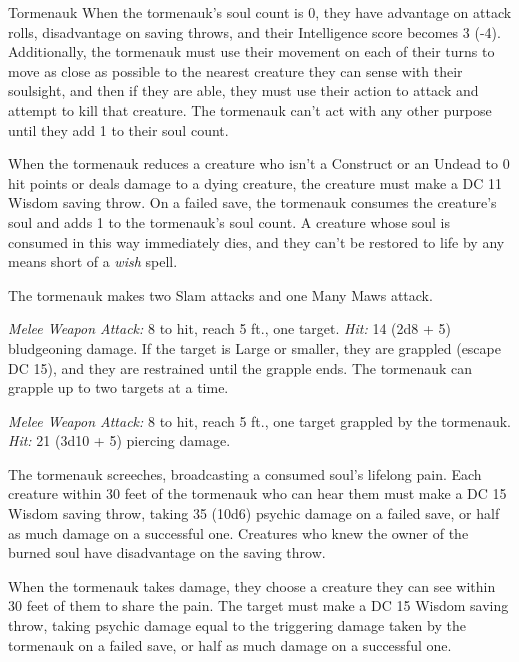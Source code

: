 \documentclass[10pt,a4paper,twoside,bg=print,twocolumn,openany,nodeprecatedcode]{dndbook}
\begin{document}
\begin{DndMonster}[float=t]{Tormenauk}
\DndMonsterBasics[
armor-class = {17 (natural armor)},
hit-points = {\DndDice{13d10 + 65}},
speed = {30 ft.}
]
\DndMonsterAbilityScores[
 str = 20,
 dex = 10,
 con = 20,
 int = 15,
 wis = 15,
 cha = 18
]
\DndMonsterDetails[
saving-throws = {Con +8, Wis +5, Cha +7},
skills = {Intimidation +7, Perception +5},
senses = {darkvision 120 ft., soulsight 30 ft., passive perception 15},
languages = {Abyssal, Common, telepathy 120 ft.},
challenge = 8,
]
When the tormenauk's soul count is 0, they have advantage on attack rolls, disadvantage on saving throws, and their Intelligence score becomes 3 (-4). Additionally, the tormenauk must use their movement on each of their turns to move as close as possible to the nearest creature they can sense with their soulsight, and then if they are able, they must use their action to attack and attempt to kill that creature. The tormenauk can't act with any other purpose until they add 1 to their soul count.

When the tormenauk reduces a creature who isn't a Construct or an Undead to 0 hit points or deals damage to a dying creature, the creature must make a DC 11 Wisdom saving throw. On a failed save, the tormenauk consumes the creature's soul and adds 1 to the tormenauk's soul count. A creature whose soul is consumed in this way immediately dies, and they can't be restored to life by any means short of a \textit{wish} spell.

The tormenauk makes two Slam attacks and one Many Maws attack.

\textsl{Melee Weapon Attack:} 8 to hit, reach 5 ft., one target. \textsl{Hit:} 14 (2d8 + 5) bludgeoning damage. If the target is Large or smaller, they are grappled (escape DC 15), and they are restrained until the grapple ends. The tormenauk can grapple up to two targets at a time.

\textsl{Melee Weapon Attack:} 8 to hit, reach 5 ft., one target grappled by the tormenauk. \textsl{Hit:} 21 (3d10 + 5) piercing damage.

The tormenauk screeches, broadcasting a consumed soul's lifelong pain. Each creature within 30 feet of the tormenauk who can hear them must make a DC 15 Wisdom saving throw, taking 35 (10d6) psychic damage on a failed save, or half as much damage on a successful one. Creatures who knew the owner of the burned soul have disadvantage on the saving throw.

When the tormenauk takes damage, they choose a creature they can see within 30 feet of them to share the pain. The target must make a DC 15 Wisdom saving throw, taking psychic damage equal to the triggering damage taken by the tormenauk on a failed save, or half as much damage on a successful one.

\end{DndMonster}
\end{document}
